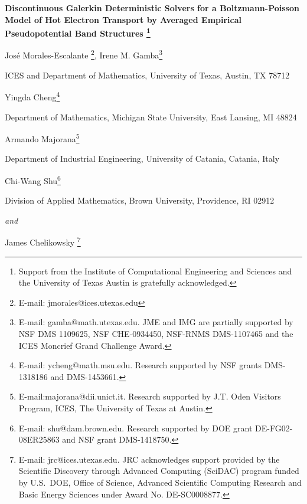 \documentclass[11pt]{article}
\begin{document}
\baselineskip=2pc

\begin{center}
{\bf Discontinuous Galerkin Deterministic Solvers for a
Boltzmann-Poisson Model of Hot Electron Transport by Averaged
Empirical Pseudopotential Band Structures
\footnote{Support from the Institute of Computational
Engineering and Sciences and the University of Texas Austin is
gratefully acknowledged.}}
\end{center}

\vspace{.10in}

\centerline{ Jos\'e Morales-Escalante \footnote{E-mail: jmorales@ices.utexas.edu}, 
Irene M. Gamba\footnote{E-mail: gamba@math.utexas.edu. 
JME and IMG  are partially supported by NSF DMS 1109625, NSF  CHE-0934450, NSF-RNMS  DMS-1107465  and the ICES Moncrief  Grand Challenge Award. }}

\smallskip

\centerline{ICES and Department of Mathematics, University of Texas,
Austin, TX 78712}

\bigskip

\centerline{
Yingda Cheng\footnote{E-mail: ycheng@math.msu.edu. 
Research supported by NSF grants DMS-1318186 and DMS-1453661.}}
 
\smallskip
 
\centerline{Department of Mathematics, Michigan State University,
East Lansing, MI 48824}


\bigskip

\centerline{Armando Majorana\footnote{E-mail:majorana@dii.unict.it. Research supported by J.T. Oden Visitors Program, ICES, The University of Texas at Austin.}}

\smallskip

\centerline{Department of Industrial Engineering,
University of Catania, Catania, Italy}

\bigskip

\centerline{Chi-Wang Shu\footnote{E-mail: shu@dam.brown.edu.  Research
supported by DOE grant DE-FG02-08ER25863 and NSF grant DMS-1418750.}}

\smallskip

\centerline{Division of Applied Mathematics, Brown University,
Providence, RI 02912}

\centerline{\em and}

\smallskip

\centerline{ 
James Chelikowsky \footnote{E-mail: jrc@ices.utexas.edu. JRC acknowledges support provided by the Scientific Discovery
through Advanced Computing (SciDAC) program funded by U.S.~DOE, Office
of Science,
Advanced Scientific Computing Research and Basic Energy Sciences under
Award No. DE-SC0008877. }}
\end{document}
